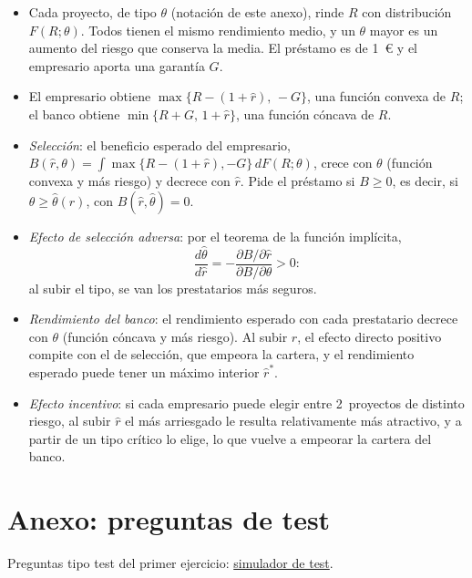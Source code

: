 \documentclass[11pt]{article}
\begin{document}
\begin{itemize}
\item Cada proyecto, de tipo $\theta$ (notación de este anexo), rinde $R$ con distribución $F(R;\theta)$. Todos tienen el mismo rendimiento medio, y un $\theta$ mayor es un aumento del riesgo que conserva la media\nocite{RothschildStiglitz1970Increasing}. El préstamo es de 1~€ y el empresario aporta una garantía $G$.
\item El empresario obtiene $\max\{R-(1+\hat r),\,-G\}$, una función convexa de $R$; el banco obtiene $\min\{R+G,\,1+\hat r\}$, una función cóncava de $R$.
\item \emph{Selección}: el beneficio esperado del empresario, $B(\hat r,\theta)=\int\max\{R-(1+\hat r),-G\}\,dF(R;\theta)$, crece con $\theta$ (función convexa y más riesgo) y decrece con $\hat r$. Pide el préstamo si $B\geq 0$, es decir, si $\theta\geq\hat\theta(\hat r)$, con $B(\hat r,\hat\theta)=0$.
\item \emph{Efecto de selección adversa}: por el teorema de la función implícita,
  \begin{equation}
  \frac{d\hat\theta}{d\hat r}=-\frac{\partial B/\partial\hat r}{\partial B/\partial\theta}>0 :
  \end{equation}
  al subir el tipo, se van los prestatarios más seguros.
\item \emph{Rendimiento del banco}: el rendimiento esperado con cada prestatario decrece con $\theta$ (función cóncava y más riesgo). Al subir $\hat r$, el efecto directo positivo compite con el de selección, que empeora la cartera, y el rendimiento esperado puede tener un máximo interior $\hat r^*$.
\item \emph{Efecto incentivo}: si cada empresario puede elegir entre 2~proyectos de distinto riesgo, al subir $\hat r$ el más arriesgado le resulta relativamente más atractivo, y a partir de un tipo crítico lo elige, lo que vuelve a empeorar la cartera del banco.
\end{itemize}
\findemo

\section{Anexo: preguntas de test}\label{anexo:test}

\begin{anotaciones}
Preguntas tipo test del primer ejercicio: \href{https://www.victorgutierrezmarcos.es/oposicion/temario/primer-ejercicio/test/simulador.html?tema=3.A.13}{simulador de test}.
\end{anotaciones}

\nocite{Arrow1964Role,MachoStadlerPerezCastrillo2001Introduction,BoltonDewatripont2005Contract,NicholsonSnyder2017Microeconomic}
\bibliografia
\end{document}
